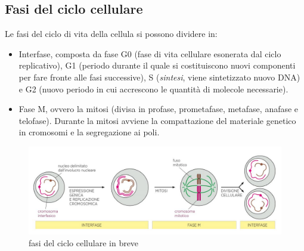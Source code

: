     \subsection{Fasi del ciclo cellulare}
        Le fasi del ciclo di vita della cellula si possono dividere in:
        \begin{itemize}
            \item Interfase, composta da fase G0 (fase di vita cellulare esonerata dal ciclo replicativo), G1 (periodo durante il quale si costituiscono nuovi componenti per fare fronte alle fasi successive), S (\textit{sintesi}, viene sintetizzato nuovo DNA) e G2 (nuovo periodo in cui accrescono le quantità di molecole necessarie).
            \item Fase M, ovvero la mitosi (divisa in profase, prometafase, metafase, anafase e telofase). Durante la mitosi avviene la compattazione del materiale genetico in cromosomi e la segregazione ai poli.
        \end{itemize}
    
     \begin{figure}[h]
            \centering
            \includegraphics[width=1\textwidth]{images/mitosiBreve.JPG}
            \caption{\small fasi del ciclo cellulare in breve}
            \label{fig:mesh1}
        \end{figure}
    
